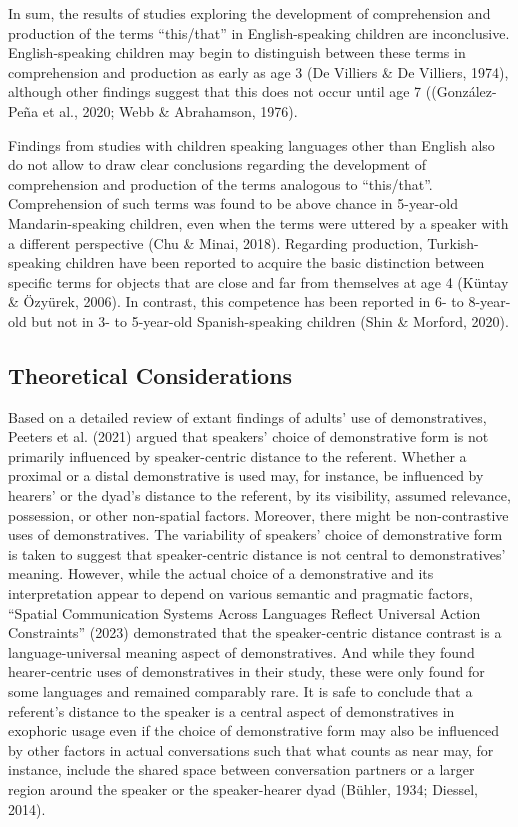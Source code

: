 \documentclass[
  man,floatsintext]{apa6}
\begin{document}
In sum, the results of studies exploring the development of comprehension and production of the terms ``this/that'' in English-speaking children are inconclusive. English-speaking children may begin to distinguish between these terms in comprehension and production as early as age 3 (De Villiers \& De Villiers, 1974), although other findings suggest that this does not occur until age 7 ((González-Peña et al., 2020; Webb \& Abrahamson, 1976).

Findings from studies with children speaking languages other than English also do not allow to draw clear conclusions regarding the development of comprehension and production of the terms analogous to ``this/that''. Comprehension of such terms was found to be above chance in 5-year-old Mandarin-speaking children, even when the terms were uttered by a speaker with a different perspective (Chu \& Minai, 2018). Regarding production, Turkish-speaking children have been reported to acquire the basic distinction between specific terms for objects that are close and far from themselves at age 4 (Küntay \& Özyürek, 2006). In contrast, this competence has been reported in 6- to 8-year-old but not in 3- to 5-year-old Spanish-speaking children (Shin \& Morford, 2020).

\subsection{Theoretical Considerations}\label{theoretical-considerations}

Based on a detailed review of extant findings of adults' use of demonstratives, Peeters et al. (2021) argued that speakers' choice of demonstrative form is not primarily influenced by speaker-centric distance to the referent. Whether a proximal or a distal demonstrative is used may, for instance, be influenced by hearers' or the dyad's distance to the referent, by its visibility, assumed relevance, possession, or other non-spatial factors. Moreover, there might be non-contrastive uses of demonstratives. The variability of speakers' choice of demonstrative form is taken to suggest that speaker-centric distance is not central to demonstratives' meaning. However, while the actual choice of a demonstrative and its interpretation appear to depend on various semantic and pragmatic factors, {``Spatial Communication Systems Across Languages Reflect Universal Action Constraints''} (2023) demonstrated that the speaker-centric distance contrast is a language-universal meaning aspect of demonstratives. And while they found hearer-centric uses of demonstratives in their study, these were only found for some languages and remained comparably rare. It is safe to conclude that a referent's distance to the speaker is a central aspect of demonstratives in exophoric usage even if the choice of demonstrative form may also be influenced by other factors in actual conversations such that what counts as near may, for instance, include the shared space between conversation partners or a larger region around the speaker or the speaker-hearer dyad (Bühler, 1934; Diessel, 2014).
\end{document}
